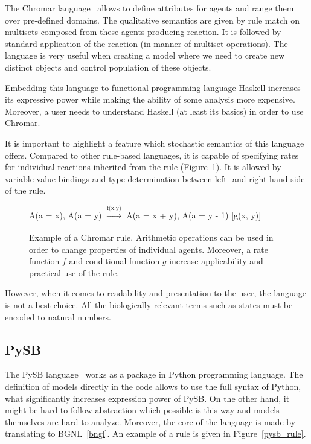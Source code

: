 \documentclass[12pt]{fithesis2}
\begin{document}
The Chromar language~\cite{honorato2017chromar} allows to define attributes for agents and range them over pre-defined domains. The qualitative semantics are given by rule match on multisets composed from these agents producing reaction. It is followed by standard application of the reaction (in manner of multiset operations). The language is very useful when creating a model where we need to create new distinct objects and control population of these objects.

Embedding this language to functional programming language Haskell increases its expressive power while making the ability of some analysis more expensive. Moreover, a user needs to understand Haskell (at least its basics) in order to use Chromar.

It is important to highlight a feature which stochastic semantics of this language offers. Compared to other rule-based languages, it is capable of specifying rates for individual reactions inherited from the rule (Figure~\ref{chromar_rule}). It is allowed by variable value bindings and type-determination between left- and right-hand side of the rule.

\begin{figure}[!h]
\begin{center}
A(a = x), A(a = y) $\xrightarrow[]{\text{f(x,y)}}$ A(a = x + y), A(a = y - 1) [g(x, y)]
\end{center}
\caption{Example of a Chromar rule. Arithmetic operations can be used in order to change properties of individual agents. Moreover, a rate function $f$ and conditional function $g$ increase applicability and practical use of the rule.}\label{chromar-rule}\label{chromar_rule}
\end{figure}

However, when it comes to readability and presentation to the user, the language is not a best choice. All the biologically relevant terms such as states must be encoded to natural numbers.

\subsection{PySB}

The PySB language~\cite{Lopez646} works as a package in Python programming language. The definition of models directly in the code allows to use the full syntax of Python, what significantly increases expression power of PySB. On the other hand, it might be hard to follow abstraction which possible is this way and models themselves are hard to analyze. Moreover, the core of the language is made by translating to BGNL~\ref{bngl}. An example of a rule is given in Figure~\ref{pysb_rule}.
\end{document}
